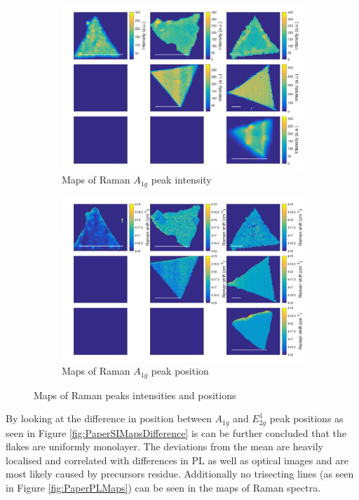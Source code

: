 \documentclass[12pt]{article}
\begin{document}
\begin{figure}[h]
\begin{center}
\begin{subfigure}[b]{0.4\textwidth}
			\includegraphics[width=\textwidth]{PaperSIMapsIntensityA.png}
			\caption{Maps of Raman $A_{1g}$ peak intensity}
			\label{fig:PaperSIMapsIntensityA}
		\end{subfigure}
		\quad
		\begin{subfigure}[b]{0.4\textwidth}
			\includegraphics[width=\textwidth]{PaperSIMapsPositionA.png}
			\caption{Maps of Raman $A_{1g}$ peak position}
			\label{fig:PaperSIMapsPositionA}
		\end{subfigure}
		\caption{Maps of Raman peaks intensities and positions}
		\label{fig:PaperSIMapsRaman}
	\end{center}
\end{figure}

By looking at the difference in position between $A_{1g}$ and $E^1_{2g}$ peak positions as seen in Figure \ref{fig:PaperSIMapsDifference} is can be further concluded that the flakes are uniformly monolayer. The deviations from the mean are heavily localised and correlated with differences in PL as well as optical images and are most likely caused by precursors residue. Additionally no trisecting lines (as seen in Figure \ref{fig:PaperPLMaps}) can be seen in the maps of Raman spectra.
\end{document}

